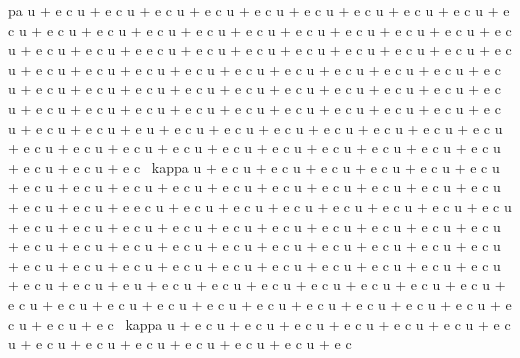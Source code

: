 \documentclass[
  ukrainian,
]{article}
\begin{document}
pa u + e c \kappa u + e c \kappa u + e c \kappa u + e c \kappa u + e c
\kappa u + e c \kappa u + e c \kappa u + e c \kappa u + e c \kappa u + e
c \kappa u + e c \kappa u + e c \kappa u + e c \kappa u + e c \kappa u +
e c \kappa u + e c \kappa u + e c \kappa u + e c \kappa u + e c \kappa u
+ e c \kappa u + e c \kappa u + e c \kappa u + e e c \kappa u + e c
\kappa u + e c \kappa u + e c \kappa u + e c \kappa u + e c \kappa u + e
c \kappa u + e c \kappa u + e c \kappa u + e c \kappa u + e c \kappa u +
e c \kappa u + e c \kappa u + e c \kappa u + e c \kappa u + e c \kappa u
+ e c \kappa u + e c \kappa u + e c \kappa u + e c \kappa u + e c
\kappa u + e c \kappa u + e c \kappa u + e c \kappa u + e c \kappa u + e
c \kappa u + e c \kappa u + e c \kappa u + e c \kappa u + e c \kappa u +
e c \kappa u + e c \kappa u + e c \kappa u + e c \kappa u + e c \kappa u
+ e c \kappa u + e c \kappa u + e c \kappa u + e c \kappa u + e c
\kappa u + e u + e c \kappa u + e c \kappa u + e c \kappa u + e c
\kappa u + e c \kappa u + e c \kappa u + e c \kappa u + e c \kappa u + e
c \kappa u + e c \kappa u + e c \kappa u + e c \kappa u + e c \kappa u +
e c \kappa u + e c \kappa u + e c \kappa u + e c \kappa u + e c \kappa u
+ e c \kappa u + e c ~kappa u + e c \kappa u + e c \kappa u + e c
\kappa u + e c \kappa u + e c \kappa u + e c \kappa u + e c \kappa u + e
c \kappa u + e c \kappa u + e c \kappa u + e c \kappa u + e c \kappa u +
e c \kappa u + e c \kappa u + e c \kappa u + e c \kappa u + e c \kappa u
+ e c \kappa u + e e c \kappa u + e c \kappa u + e c \kappa u + e c
\kappa u + e c \kappa u + e c \kappa u + e c \kappa u + e c \kappa u + e
c \kappa u + e c \kappa u + e c \kappa u + e c \kappa u + e c \kappa u +
e c \kappa u + e c \kappa u + e c \kappa u + e c \kappa u + e c \kappa u
+ e c \kappa u + e c \kappa u + e c \kappa u + e c \kappa u + e c
\kappa u + e c \kappa u + e c \kappa u + e c \kappa u + e c \kappa u + e
c \kappa u + e c \kappa u + e c \kappa u + e c \kappa u + e c \kappa u +
e c \kappa u + e c \kappa u + e c \kappa u + e c \kappa u + e c \kappa u
+ e c \kappa u + e c \kappa u + e c \kappa u + e u + e c \kappa u + e c
\kappa u + e c \kappa u + e c \kappa u + e c \kappa u + e c \kappa u + e
c \kappa u + e c \kappa u + e c \kappa u + e c \kappa u + e c \kappa u +
e c \kappa u + e c \kappa u + e c \kappa u + e c \kappa u + e c \kappa u
+ e c \kappa u + e c \kappa u + e c \kappa u + e c ~kappa u + e c
\kappa u + e c \kappa u + e c \kappa u + e c \kappa u + e c \kappa u + e
c \kappa u + e c \kappa u + e c \kappa u + e c \kappa u + e c \kappa u +
e c \kappa u + e c \kappa u + e c \kappa u + e c
\end{document}

